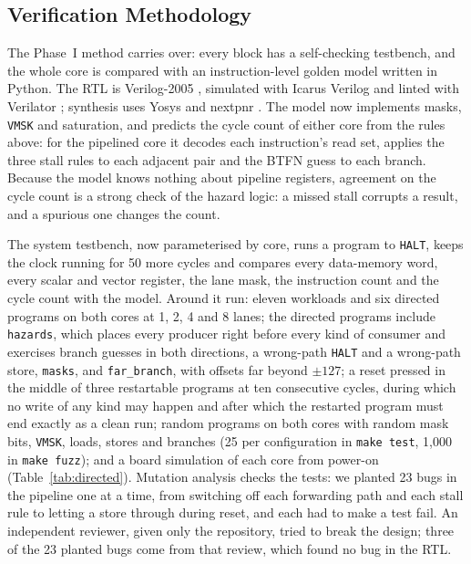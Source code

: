 \subsection{Verification Methodology}\label{sec:verif}
The Phase~I method carries over: every block has a self-checking testbench, and the
whole core is compared with an instruction-level golden model written in Python. The
RTL is Verilog-2005 \cite{ieee1364}, simulated with Icarus Verilog \cite{icarus} and
linted with Verilator \cite{verilator}; synthesis uses Yosys \cite{yosys} and
nextpnr \cite{nextpnr}. The
model now implements masks, \texttt{VMSK} and saturation, and predicts the cycle count
of either core from the rules above: for the pipelined core it decodes each instruction's
read set, applies the three stall rules to each adjacent pair and the BTFN guess to each
branch. Because the model knows nothing about pipeline registers, agreement on the cycle
count is a strong check of the hazard logic: a missed stall corrupts a result, and a
spurious one changes the count.

The system testbench, now parameterised by core, runs a program to \texttt{HALT}, keeps
the clock running for 50 more cycles and compares every data-memory word, every scalar
and vector register, the lane mask, the instruction count and the cycle count with the
model. Around it run: eleven workloads and six directed programs on both cores at
1, 2, 4 and 8 lanes; the directed programs include \texttt{hazards}, which places every
producer right before every kind of consumer and exercises branch guesses in both
directions, a wrong-path \texttt{HALT} and a wrong-path store, \texttt{masks}, and
\texttt{far\_branch}, with offsets far beyond $\pm127$; a reset pressed in the middle of
three restartable programs at ten consecutive cycles, during which no write of any kind
may happen and after which the restarted program must end exactly as a clean run; random
programs on both cores with random mask bits, \texttt{VMSK}, loads, stores and
branches (25 per configuration in \texttt{make test}, 1,000 in \texttt{make fuzz}); and a
board simulation of each core from power-on (Table~\ref{tab:directed}). Mutation analysis \cite{demillo} checks the
tests: we planted 23 bugs in the pipeline one at a time, from switching off each
forwarding path and each stall rule to letting a store through during reset, and each
had to make a test fail. An independent reviewer, given only the repository, tried to
break the design; three of the 23 planted bugs come from that review, which found no bug
in the RTL.

